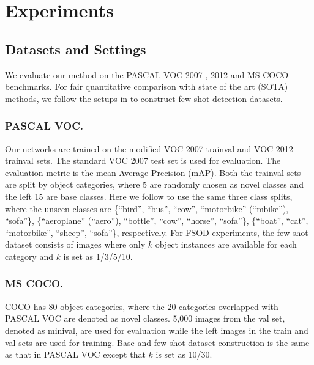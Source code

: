 \documentclass[runningheads]{llncs}
\begin{document}
\section{Experiments}

\subsection{Datasets and Settings}
We evaluate our method on the PASCAL VOC 2007 \cite{voc07}, 2012 \cite{voc12} and MS COCO \cite{coco} benchmarks. 
For fair quantitative comparison with state of the art (SOTA) methods, we follow the setups in \cite{yolore,metarcnn} to construct few-shot detection datasets.

\subsubsection{PASCAL VOC.}
Our networks are trained on the modified VOC 2007 trainval and VOC 2012 trainval sets. 
The standard VOC 2007 test set is used for evaluation. 
The evaluation metric is the mean Average Precision (mAP). 
Both the trainval sets are split by object categories, where 5 are randomly chosen as novel classes and the left 15 are base classes. 
Here we follow \cite{yolore} to use the same three class splits, where the unseen classes are \{``bird'', ``bus'', ``cow'', ``motorbike'' (``mbike''), ``sofa''\}, \{``aeroplane'' (``aero''), ``bottle'', ``cow'', ``horse'', ``sofa''\}, \{``boat'', ``cat'', ``motorbike'', ``sheep'', ``sofa''\}, respectively. 
For FSOD experiments, the few-shot dataset consists of images where only $k$ object instances are available for each category and $k$ is set as 1/3/5/10. 

\subsubsection{MS COCO.}
COCO has 80 object categories, where the 20 categories overlapped with PASCAL VOC are denoted as novel classes. 
5,000 images from the val set, denoted as minival, are used for evaluation while the left images in the train and val sets are used for training. 
Base and few-shot dataset construction is the same as that in PASCAL VOC except that $k$ is set as 10/30. 
\end{document}
